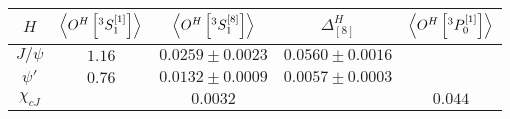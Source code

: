 \begin{tabular}{ccccc}
\hline
$H$ &
  $\expval{O^H\left[^3S_1^{\left[1\right]}\right]}$ &
  $\expval{O^H\left[^3S_1^{\left[8\right]}\right]}$ &
  $\Delta_{[8]}^H$ &
  $\expval{O^H\left[^3P_0^{\left[1\right]}\right]}$ \\ \hline
$J/\psi$    & $1.16$ & $0.0259\pm 0.0023$ & $0.0560\pm0.0016$ &         \\
$\psi'$     & $0.76$ & $0.0132\pm 0.0009$ & $0.0057\pm0.0003$ &         \\
$\chi_{cJ}$ &        & $0.0032$           &                   & $0.044$ \\ \hline
\end{tabular}

